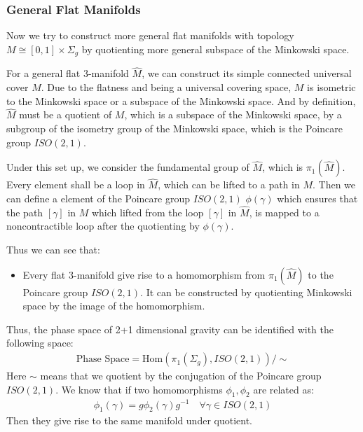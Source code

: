 
\subsubsection{General Flat Manifolds}

Now we try to construct more general flat manifolds with topology $ M
\cong [0,1] \times \Sigma_g $ by quotienting more general subspace of
the Minkowski space.

For a general flat 3-manifold $ \hat{M} $, we can construct its
simple connected universal cover $ M $. Due to the flatness and being
a universal covering space, $ M $ is isometric to the Minkowski space
or a subspace of the Minkowski space. And by definition, $ \hat{M} $
must be a quotient of $ M $, which is a subspace of the Minkowski
space, by a subgroup of the isometry group of the Minkowski space,
which is the Poincare group $ ISO(2,1) $.

Under this set up, we consider the fundamental group of $ \hat{M} $,
which is $ \pi_1(\hat{M}) $. Every element shall be a loop in $
\hat{M} $, which can be lifted to a path in $ M $. Then we can define
a element of the Poincare group $ ISO(2,1) $ $ \phi(\gamma) $ which
ensures that the
path $ [\gamma] $ in $ M $ which lifted from the loop $ [\gamma] $ in $
\hat{M} $, is mapped to a noncontractible loop after the quotienting
by $ \phi(\gamma) $.

Thus we can see that:
\begin{itemize}
  \item Every flat 3-manifold give rise to a homomorphism from $
    \pi_1(\hat{M}) $ to the Poincare group $
    ISO(2,1) $. It can be constructed by quotienting Minkowski space
    by the image of the homomorphism.
\end{itemize}


Thus, the phase space of 2+1 dimensional gravity can be identified
with the following space:
\begin{align}
  \text{Phase Space} = \text{Hom}(\pi_1(\Sigma_g), ISO(2,1))/\sim
\end{align}
Here $ \sim $ means that we quotient by the conjugation of the
Poincare group $ ISO(2,1) $. We know that if two homomorphisms $
\phi_1, \phi_2 $ are related as:
\begin{align}
  \phi_1(\gamma) = g \phi_2(\gamma) g^{-1} \quad \forall \gamma \in ISO(2,1)
\end{align}
Then they give rise to the same manifold under quotient.

